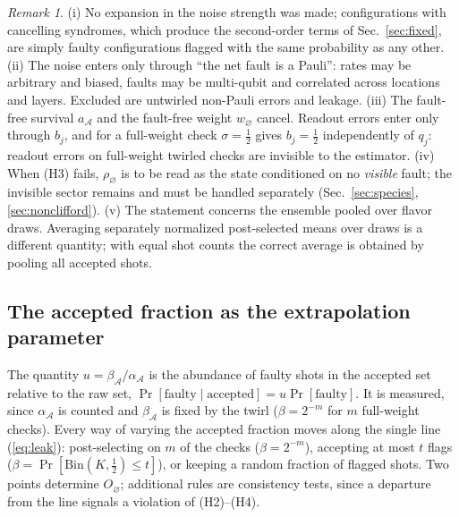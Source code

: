\documentclass[11pt,a4paper]{article}
\theoremstyle{remark}
\newtheorem{remark}{Remark}
\newcommand{\Bin}{\mathrm{Bin}}
\newcommand{\acc}{\mathcal{A}}
\begin{document}
\begin{remark}
(i) No expansion in the noise strength was made; configurations with cancelling syndromes, which produce the second-order terms of Sec.~\ref{sec:fixed}, are simply faulty configurations flagged with the same probability as any other. (ii) The noise enters only through ``the net fault is a Pauli'': rates may be arbitrary and biased, faults may be multi-qubit and correlated across locations and layers. Excluded are untwirled non-Pauli errors and leakage. (iii) The fault-free survival $a_\acc$ and the fault-free weight $w_\varnothing$ cancel. Readout errors enter only through $b_j$, and for a full-weight check $\sigma=\tfrac12$ gives $b_j=\tfrac12$ independently of $q_j$: readout errors on full-weight twirled checks are invisible to the estimator. (iv) When (H3) fails, $\rho_\varnothing$ is to be read as the state conditioned on no \emph{visible} fault; the invisible sector remains and must be handled separately (Sec.~\ref{sec:species}, \ref{sec:nonclifford}). (v) The statement concerns the ensemble pooled over flavor draws. Averaging separately normalized post-selected means over draws is a different quantity; with equal shot counts the correct average is obtained by pooling all accepted shots.
\end{remark}

\subsection{The accepted fraction as the extrapolation parameter}

The quantity $u=\beta_\acc/\alpha_\acc$ is the abundance of faulty shots in the accepted set relative to the raw set, $\Pr[\text{faulty}\mid\text{accepted}]=u\Pr[\text{faulty}]$. It is measured, since $\alpha_\acc$ is counted and $\beta_\acc$ is fixed by the twirl ($\beta=2^{-m}$ for $m$ full-weight checks). Every way of varying the accepted fraction moves along the single line (\ref{eq:leak}): post-selecting on $m$ of the checks ($\beta=2^{-m}$), accepting at most $t$ flags ($\beta=\Pr[\Bin(K,\tfrac12)\le t]$), or keeping a random fraction of flagged shots. Two points determine $O_\varnothing$; additional rules are consistency tests, since a departure from the line signals a violation of (H2)--(H4).
\end{document}
